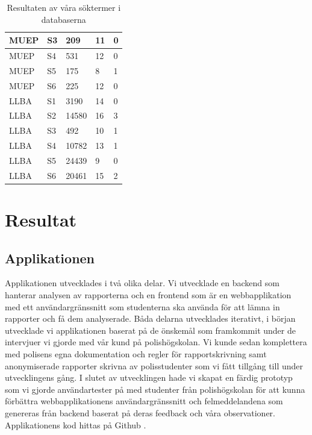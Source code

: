 \documentclass[swedish]{maucsthesis}
\begin{document}
\begin{table}[H]
\begin{tabular}{|l|l|l|l|l|}
MUEP    & S3      & 209      & 11             & 0                \\ \hline
MUEP    & S4      & 531      & 12             & 0                \\ \hline
MUEP    & S5      & 175      & 8              & 1                \\ \hline
MUEP    & S6      & 225      & 12              & 0                \\ 
\hline
LLBA    & S1      & 3190     & 14             & 0                \\ \hline
LLBA    & S2      & 14580    & 16             & 3                \\ \hline
LLBA    & S3      & 492      & 10             & 1                \\ \hline
LLBA    & S4      & 10782    & 13             & 1                \\ \hline
LLBA    & S5      & 24439    & 9              & 0                \\ \hline
LLBA    & S6      & 20461    & 15              & 2                \\ \hline
\end{tabular}
\caption*{Resultaten av våra söktermer i databaserna}
\label{searchtable}
\end{table}
\section{Resultat}
\subsection{Applikationen}\label{applikationen}

Applikationen utvecklades i två olika delar. Vi utvecklade en backend som
hanterar analysen av rapporterna och en frontend som är en webbapplikation med
ett användargränssnitt som studenterna ska använda för att lämna in rapporter
och få dem analyserade. Båda delarna utvecklades iterativt, i början utvecklade
vi applikationen baserat på de önskemål som framkommit under de intervjuer vi
gjorde med vår kund på polishögskolan. Vi kunde sedan komplettera med polisens
egna dokumentation och regler för rapportskrivning samt anonymiserade rapporter
skrivna av polisstudenter som vi fått tillgång till under utvecklingens gång. I
slutet av utvecklingen hade vi skapat en färdig prototyp som vi gjorde
användartester på med studenter från polishögskolan för att kunna förbättra
webbapplikationens användargränssnitt och felmeddelandena som genereras från
backend baserat på deras feedback och våra observationer.
Applikationens kod hittas på Github \cite{kalle:2019}. 
\end{document}
